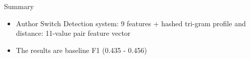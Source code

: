 \documentclass[aspectratio=169,11pt]{beamer}
\begin{document}

\begin{frame}{Summary}
\begin{itemize}\itemsep0.7em
\item Author Switch Detection system: 9 features + hashed tri-gram profile and distance: 11-value pair feature vector
\item The results are baseline F1 (0.435 - 0.456)
\end{itemize}
\vfill
{}
\end{frame}
\end{document}
